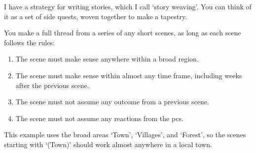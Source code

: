 \label{sidequests}

\begin{multicols}{2}
\noindent
I have a strategy for writing stories, which I call `story weaving'.
You can think of it as a set of side quests, woven together to make a tapestry.

You make a full thread from a series of any short scenes, as long as each scene follows the rules:

\begin{enumerate}
  \item
  The scene must make sense anywhere within a broad region.
  \item
  The scene must make sense within almost any time frame, including weeks after the previous scene.
  \item
  The scene must not assume any outcome from a previous scene.
  \item
  The scene must not assume any reactions from the \glspl{pc}.
\end{enumerate}

This example uses the broad areas `Town', `Villages', and `Forest', so the scenes starting with `(Town)' should work almost anywhere in a local town.

\end{multicols}

